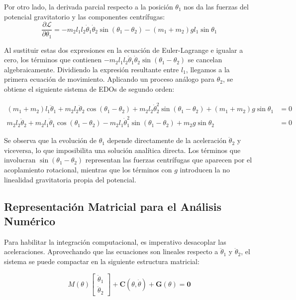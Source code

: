 \documentclass[13pt]{extarticle}
\begin{document}
Por otro lado, la derivada parcial respecto a la posición $\theta_1$ nos da las fuerzas del potencial gravitatorio y las componentes centrífugas:
\begin{equation}
    \frac{\partial \mathcal{L}}{\partial \theta_1} = -m_2 l_1 l_2 \dot{\theta}_1 \dot{\theta}_2 \sin(\theta_1 - \theta_2) - (m_1 + m_2) g l_1 \sin\theta_1
\end{equation}

Al sustituir estas dos expresiones en la ecuación de Euler-Lagrange e igualar a cero, los términos que contienen $-m_2 l_1 l_2 \dot{\theta}_1 \dot{\theta}_2 \sin(\theta_1 - \theta_2)$ se cancelan algebraicamente. Dividiendo la expresión resultante entre $l_1$, llegamos a la primera ecuación de movimiento. Aplicando un proceso análogo para $\theta_2$, se obtiene el siguiente sistema de EDOs de segundo orden:

\begin{align}
    (m_1 + m_2) l_1 \ddot{\theta}_1 + m_2 l_2 \ddot{\theta}_2 \cos(\theta_1 - \theta_2) + m_2 l_2 \dot{\theta}_2^2 \sin(\theta_1 - \theta_2) + (m_1 + m_2) g \sin\theta_1 &= 0 \\
    m_2 l_2 \ddot{\theta}_2 + m_2 l_1 \ddot{\theta}_1 \cos(\theta_1 - \theta_2) - m_2 l_1 \dot{\theta}_1^2 \sin(\theta_1 - \theta_2) + m_2 g \sin\theta_2 &= 0
\end{align}

Se observa que la evolución de $\theta_1$ depende directamente de la aceleración $\ddot{\theta}_2$ y viceversa, lo que imposibilita una solución analítica directa. Los términos que involucran $\sin(\theta_1 - \theta_2)$ representan las fuerzas centrífugas que aparecen por el acoplamiento rotacional, mientras que los términos con $g$ introducen la no linealidad gravitatoria propia del potencial.
\subsection{Representación Matricial para el Análisis Numérico}

Para habilitar la integración computacional, es imperativo desacoplar las aceleraciones. Aprovechando que las ecuaciones son lineales respecto a $\ddot{\theta}_1$ y $\ddot{\theta}_2$, el sistema se puede compactar en la siguiente estructura matricial:

\begin{equation}
M(\theta) \begin{bmatrix} \ddot{\theta}_1 \\ \ddot{\theta}_2 \end{bmatrix} + \mathbf{C}(\theta, \dot{\theta}) + \mathbf{G}(\theta) = \mathbf{0}
\end{equation}
\end{document}
